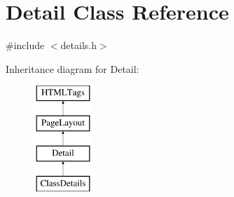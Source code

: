 \hypertarget{classDetail}{\section{Detail Class Reference}
\label{classDetail}
}


{\ttfamily \#include $<$details.\-h$>$}

Inheritance diagram for Detail\-:\begin{figure}[H]
\begin{center}
\leavevmode
\includegraphics[height=4.000000cm]{classDetail}
\end{center}
\end{figure}
